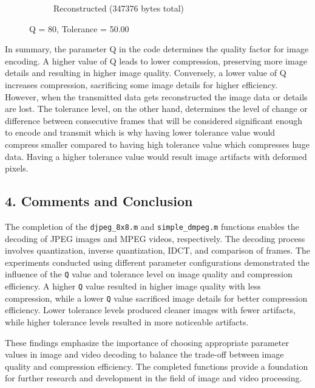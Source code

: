 \documentclass{article}
\begin{document}
\begin{figure}[ht]
\begin{subfigure}[t]{0.45\textwidth}
			\caption{Reconstructed (347376 bytes total)}
			\label{fig:2B_Tolerance50Reconstructed}

		\end{subfigure}

		\caption{Q = 80, Tolerance = 50.00}
		\label{fig:2B_Tolerance50}
	\end{figure}

	In summary, the parameter Q in the code determines the quality factor for image encoding. A higher value of Q leads to lower compression, preserving more image details and resulting in 
	higher image quality. Conversely, a lower value of Q increases compression, sacrificing some image details for higher efficiency. However, when the transmitted data gets reconstructed 
	the image data or details are lost. The tolerance level, on the other hand, determines the level of change or difference between consecutive frames that will be considered significant 
	enough to encode and transmit which is why having lower tolerance value would compress smaller compared to having high tolerance value which compresses huge data. Having a higher tolerance
	value would result image artifacts with deformed pixels.


	\subsection*{4. Comments and Conclusion}

	The completion of the {\texttt{djpeg\_8x8.m}} and {\texttt{simple\_dmpeg.m}} functions enables the decoding of JPEG images and MPEG videos, respectively. The decoding process involves quantization, inverse quantization, 
	IDCT, and comparison of frames. The experiments conducted using different parameter configurations demonstrated the influence of the {\texttt{Q}} value and tolerance level on image quality and compression efficiency. A 
	higher {\texttt{Q}} value resulted in higher image quality with less compression, while a lower {\texttt{Q}} value sacrificed image details for better compression efficiency. Lower tolerance levels produced cleaner 
	images with fewer artifacts, while higher tolerance levels resulted in more noticeable artifacts.

	These findings emphasize the importance of choosing appropriate parameter values in image and video decoding to balance the trade-off between image quality and compression efficiency. The completed functions provide 
	a foundation for further research and development in the field of image and video processing.
\end{document}
